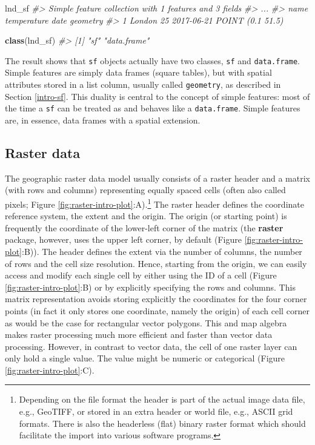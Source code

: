 \documentclass[]{krantz}
\newenvironment{Shaded}{\begin{snugshade}}{\end{snugshade}}
\newcommand{\CommentTok}[1]{\textcolor[rgb]{0.37,0.37,0.37}{\textit{#1}}}
\newcommand{\KeywordTok}[1]{\textcolor[rgb]{0.27,0.27,0.27}{\textbf{#1}}}
\newcommand{\NormalTok}[1]{#1}
\let\rmarkdownfootnote\footnote%
\def\footnote{\protect\rmarkdownfootnote}
\begin{document}
\begin{Shaded}
\begin{Highlighting}[]
\NormalTok{lnd_sf}
\CommentTok{#> Simple feature collection with 1 features and 3 fields}
\CommentTok{#> ...}
\CommentTok{#>     name temperature       date         geometry}
\CommentTok{#> 1 London          25 2017-06-21 POINT (0.1 51.5)}
\end{Highlighting}
\end{Shaded}

\begin{Shaded}
\begin{Highlighting}[]
\KeywordTok{class}\NormalTok{(lnd_sf)}
\CommentTok{#> [1] "sf"         "data.frame"}
\end{Highlighting}
\end{Shaded}

The result shows that \texttt{sf} objects actually have two classes, \texttt{sf} and \texttt{data.frame}.
Simple features are simply data frames (square tables), but with spatial attributes stored in a list column, usually called \texttt{geometry}, as described in Section \ref{intro-sf}.
This duality is central to the concept of simple features:
most of the time a \texttt{sf} can be treated as and behaves like a \texttt{data.frame}.
Simple features are, in essence, data frames with a spatial extension.

\hypertarget{raster-data}{%
\subsection{Raster data}\label{raster-data}}

The geographic raster data model usually consists of a raster header
and a matrix (with rows and columns) representing equally spaced cells (often also called pixels; Figure \ref{fig:raster-intro-plot}:A).\footnote{Depending on the file format the header is part of the actual image data file, e.g., GeoTIFF, or stored in an extra header or world file, e.g., ASCII grid formats. There is also the headerless (flat) binary raster format which should facilitate the import into various software programs.}
The raster header defines the coordinate reference system, the extent and the origin.
The origin (or starting point) is frequently the coordinate of the lower-left corner of the matrix (the \textbf{raster} package, however, uses the upper left corner, by default (Figure \ref{fig:raster-intro-plot}:B)).
The header defines the extent via the number of columns, the number of rows and the cell size resolution.
Hence, starting from the origin, we can easily access and modify each single cell by either using the ID of a cell (Figure \ref{fig:raster-intro-plot}:B) or by explicitly specifying the rows and columns.
This matrix representation avoids storing explicitly the coordinates for the four corner points (in fact it only stores one coordinate, namely the origin) of each cell corner as would be the case for rectangular vector polygons.
This and map algebra makes raster processing much more efficient and faster than vector data processing.
However, in contrast to vector data, the cell of one raster layer can only hold a single value.
The value might be numeric or categorical (Figure \ref{fig:raster-intro-plot}:C).
\end{document}
